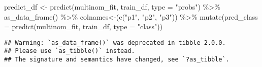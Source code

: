 \documentclass[
]{book}
\newenvironment{Shaded}{\begin{snugshade}}{\end{snugshade}}
\newcommand{\AttributeTok}[1]{\textcolor[rgb]{0.77,0.63,0.00}{#1}}
\newcommand{\ConstantTok}[1]{\textcolor[rgb]{0.00,0.00,0.00}{#1}}
\newcommand{\DecValTok}[1]{\textcolor[rgb]{0.00,0.00,0.81}{#1}}
\newcommand{\FunctionTok}[1]{\textcolor[rgb]{0.00,0.00,0.00}{#1}}
\newcommand{\NormalTok}[1]{#1}
\newcommand{\OtherTok}[1]{\textcolor[rgb]{0.56,0.35,0.01}{#1}}
\newcommand{\SpecialCharTok}[1]{\textcolor[rgb]{0.00,0.00,0.00}{#1}}
\newcommand{\StringTok}[1]{\textcolor[rgb]{0.31,0.60,0.02}{#1}}
\begin{document}
\begin{Shaded}
\begin{Highlighting}[]
\NormalTok{predict\_df }\OtherTok{\textless{}{-}} \FunctionTok{predict}\NormalTok{(multinom\_fit, train\_df, }\AttributeTok{type =} \StringTok{"probs"}\NormalTok{) }\SpecialCharTok{\%\textgreater{}\%} 
  \FunctionTok{as\_data\_frame}\NormalTok{() }\SpecialCharTok{\%\textgreater{}\%}
  \StringTok{\textasciigrave{}}\AttributeTok{colnames\textless{}{-}}\StringTok{\textasciigrave{}}\NormalTok{(}\FunctionTok{c}\NormalTok{(}\StringTok{"p1"}\NormalTok{, }\StringTok{"p2"}\NormalTok{, }\StringTok{"p3"}\NormalTok{)) }\SpecialCharTok{\%\textgreater{}\%}
  \FunctionTok{mutate}\NormalTok{(}\AttributeTok{pred\_class =} \FunctionTok{predict}\NormalTok{(multinom\_fit, train\_df, }\AttributeTok{type =} \StringTok{"class"}\NormalTok{))}
\end{Highlighting}
\end{Shaded}

\begin{verbatim}
## Warning: `as_data_frame()` was deprecated in tibble 2.0.0.
## Please use `as_tibble()` instead.
## The signature and semantics have changed, see `?as_tibble`.
\end{verbatim}

\begin{Shaded}
\end{Shaded}
\end{document}
